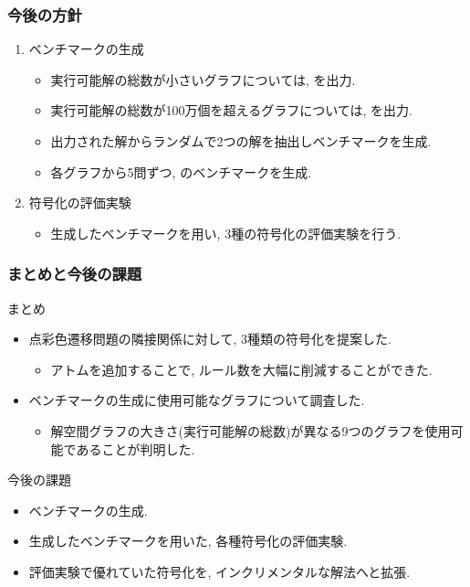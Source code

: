 \documentclass[dvipdfmx,11pt]{beamer}
\begin{document}
\begin{frame}\frametitle{今後の方針}

  \begin{enumerate}
    \item ベンチマークの生成 
    \begin{itemize}
      \item 実行可能解の総数が小さいグラフについては, を出力.
      \item 実行可能解の総数が100万個を超えるグラフについては, を出力.
      \item 出力された解からランダムで2つの解を抽出しベンチマークを生成.
      \item 各グラフから5問ずつ, のベンチマークを生成.
    \end{itemize}

    \item 符号化の評価実験
    \begin{itemize}
      \item 生成したベンチマークを用い, 3種の符号化の評価実験を行う.
    \end{itemize}
  \end{enumerate}
  

\end{frame}


\begin{frame}\frametitle{まとめと今後の課題}

  \begin{block}{まとめ}
    \begin{itemize}
      \item 点彩色遷移問題の隣接関係に対して, 3種類の符号化を提案した.
      \begin{itemize}
        \item アトムを追加することで, ルール数を大幅に削減することができた.
      \end{itemize}
      \item ベンチマークの生成に使用可能なグラフについて調査した.
      \begin{itemize}
        \item 解空間グラフの大きさ(実行可能解の総数)が異なる9つのグラフを使用可能であることが判明した.
      \end{itemize}
    \end{itemize}
  \end{block}
  
  \begin{alertblock}{今後の課題}
    \begin{itemize}
      \item ベンチマークの生成.
      \item 生成したベンチマークを用いた, 各種符号化の評価実験.
      \item 評価実験で優れていた符号化を, インクリメンタルな解法へと拡張.
    \end{itemize}
  \end{alertblock}

\end{frame}
\end{document}
